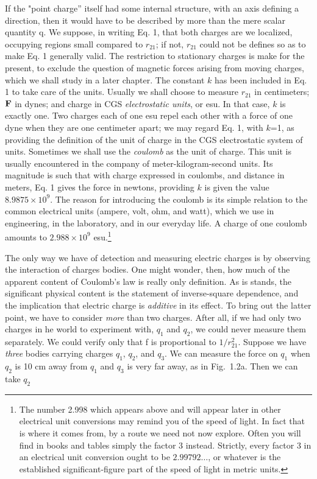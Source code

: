If the "point charge'' itself had some internal structure, with an
axis defining a direction, then it would have to be described by more
than the mere scalar quantity q. We suppose, in writing Eq. 1, that
both charges are we localized, occupying regions small compared to
$r_{21}$; if not, $r_{21}$ could not be defines so as to make Eq. 1
generally valid. The restriction to stationary charges is make for
the present, to exclude the question of magnetic forces arising from
moving charges, which we shall study in a later chapter. The constant
$k$ has been included in Eq. 1 to take care of the units. Usually we
shall choose to measure $r_{21}$ in centimeters;  $\mathbf{F}$ in dynes; and
charge in CGS \emph{electrostatic units}, or esu. In that case, $k$
is exactly one. Two charges each of one esu repel each other with a
force of one dyne when they are one centimeter apart; we may regard
Eq. 1, with $k$=1, as providing the definition of the unit of charge
in the CGS electrostatic system of units. Sometimes we shall use the
\emph{coulomb} as the unit of charge. This unit is usually
encountered in the company of meter-kilogram-second units. Its
magnitude is such that with charge expressed in coulombs, and
distance in meters, Eq. 1 gives the force in newtons, providing $k$
is given the value $8.9875\times 10^{9}$. The reason for introducing
the coulomb is its simple relation to the common electrical units
(ampere, volt, ohm, and watt), which we use in engineering, in the
laboratory, and in our everyday life. A charge of one coulomb amounts
to $2.988\times 10^{9}$ esu.\footnote {The number 2.998 which
appears above and will appear later in other electrical unit
conversions may remind you of the speed of light. In fact that is
where it comes from, by a route we need not now explore. Often you
will find in books and tables simply the factor 3 instead. Strictly,
every factor 3 in an electrical unit conversion ought to be
$2.99792\ldots$, or whatever is the established significant-figure part of
the speed of light in metric units.}

The only way we have of detection and measuring electric charges is
by observing the interaction of charges bodies. One might wonder,
then, how much of the apparent content of Coulomb's law is really
only definition. As is stands, the significant physical content is
the statement of inverse-square dependence, and the implication that
electric charge is \emph{additive} in its effect. To bring out the
latter point, we have to consider \emph{more} than two charges. After
all, if we had only two charges in he world to experiment with, $q_1$
and $q_2$, we could never measure them separately. We could verify
only that f is proportional to $1/r_{{21}}^2$. Suppose we have
\emph{three} bodies carrying charges $q_1$, $q_2$, and $q_3$. We can
measure the force on $q_1$ when $q_2$ is 10 cm away from $q_1$ and
$q_3$ is very far away, as in Fig.~1.2a. Then we can take $q_2$

